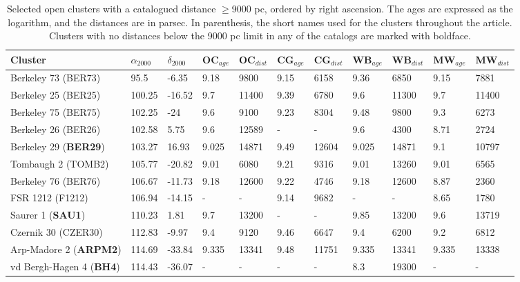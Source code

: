\documentclass{aa}
\begin{document}
 \begin{table}
 \caption{Selected open clusters with a catalogued distance $\geq$9000 pc,
 ordered by right ascension. The ages are expressed as the logarithm, and the
 distances are in parsec. In parenthesis, the short names used for the clusters
 throughout the article. Clusters with no distances below the 9000 pc limit in
 any of the catalogs are marked with boldface.}
 \label{tab:clusters}
 \centering
 \begin{tabular}{lllllllllll}
 \hline\hline
 Cluster & $\alpha_{2000}$  & $\delta_{2000}$ & OC$_{age}$ & OC$_{dist}$ & CG$_{age}$ &
 CG$_{dist}$ & WB$_{age}$ & WB$_{dist}$ & MW$_{age}$ & MW$_{dist}$ \\
 \hline
 Berkeley 73 (BER73)     & 95.5   & -6.35     & 9.18  & 9800  & 9.15  & 6158  &
 9.36 & 6850 & 9.15  & 7881  \\
 Berkeley 25 (BER25)     & 100.25 & -16.52    & 9.7   & 11400 & 9.39  & 6780  &
 9.6   & 11300 &  9.7   & 11400 \\
 Berkeley  75 (BER75)     & 102.25 & -24       & 9.6   & 9100  & 9.23  &  8304 
 & 9.48  & 9800  & 9.3   & 6273  \\
 Berkeley  26 (BER26)     & 102.58 & 5.75      & 9.6   & 12589 & -   & -   & 9.6
 & 4300  & 8.71  & 2724  \\
 Berkeley  29 (\textbf{BER29})     & 103.27 & 16.93     & 9.025 & 14871 & 9.49  & 12604 &
 9.025 & 14871 & 9.1   & 10797 \\
 Tombaugh 2 (TOMB2)     & 105.77 & -20.82    & 9.01  & 6080  & 9.21  & 9316  &
 9.01 & 13260 & 9.01  & 6565  \\
 Berkeley 76 (BER76)     & 106.67 & -11.73    & 9.18  & 12600 & 9.22  & 4746  &
 9.18 & 12600 & 8.87  & 2360  \\
 FSR 1212 (F1212)   & 106.94 & -14.15    & -   & -   & 9.14  & 9682  & -   & -
 & 8.65  & 1780  \\
 Saurer 1 (\textbf{SAU1})   & 110.23 & 1.81      & 9.7   & 13200 & -   & -   & 9.85  &
 13200 & 9.6   & 13719 \\
 Czernik 30 (CZER30)    & 112.83 & -9.97     & 9.4   & 9120  & 9.46  & 6647  &
 9.4 & 6200  & 9.2   & 6812  \\
 Arp-Madore 2 (\textbf{ARPM2})     & 114.69 & -33.84    & 9.335 & 13341 & 9.48  & 11751 &
 9.335 & 13341 & 9.335 & 13338 \\
 vd Bergh-Hagen 4 (\textbf{BH4})     & 114.43 & -36.07    & -   & -   & -   & -  
 & 8.3   & 19300 & -   & -   \\

\end{tabular}
\end{table}
\end{document}
